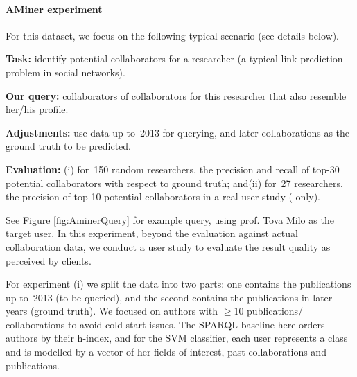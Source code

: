 \paragraph*{AMiner experiment}
\label{AMiner} For this dataset, we focus on the following typical scenario (see details below). 
\begin{compactitem}
\item \textbf{Task:} identify potential collaborators for a researcher (a typical link prediction problem in social networks).
\item \textbf{Our query:} collaborators of collaborators for this researcher that also resemble her/his profile.
\item \textbf{Adjustments:} use data up to~2013 for querying, and later collaborations as the ground truth to be predicted.
\item \textbf{Evaluation:} (i) for~150 random researchers, the precision and recall of top-30 potential collaborators with respect to ground truth; and\newline (ii) for~27 researchers, the precision of top-10 potential collaborators in a real user study (\qlang{} only).
\end{compactitem}
See Figure \ref{fig:AminerQuery} for example query, using prof. Tova Milo as the target user.  %
In this experiment, beyond the evaluation against actual collaboration data, we conduct a user study to evaluate the result quality as perceived by clients.

For experiment (i) we split the data into two parts: one
contains the publications up to~2013 (to be queried), and the second contains the
publications in later years (ground truth). We focused on authors with
$\geq10$ publications/ collaborations %
to avoid cold start issues. 
The SPARQL baseline here orders authors by their h-index, and
for the SVM classifier, each user represents a class and is modelled by a vector
of her fields of interest, past collaborations and
publications. 



